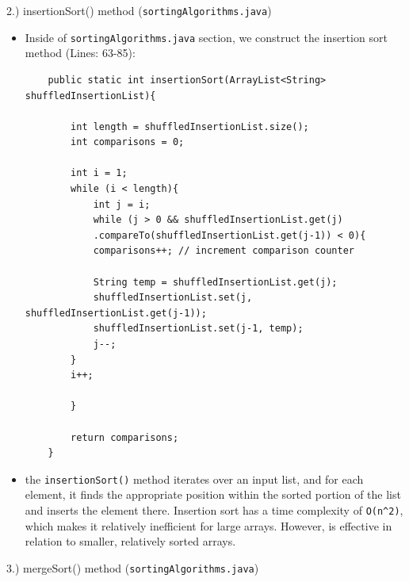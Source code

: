 \documentclass[a4paper,12pt]{article}
\begin{document}
\begin{large}
    2.) insertionSort() method (\verb|sortingAlgorithms.java|)
\end{large}


\begin{itemize}
\item Inside of \verb|sortingAlgorithms.java| section, we construct the insertion sort method (Lines: 63-85):

\begin{verbatim}
    public static int insertionSort(ArrayList<String> shuffledInsertionList){
		
        int length = shuffledInsertionList.size();
        int comparisons = 0; 

        int i = 1;
        while (i < length){
            int j = i;
            while (j > 0 && shuffledInsertionList.get(j)
            .compareTo(shuffledInsertionList.get(j-1)) < 0){ 
            comparisons++; // increment comparison counter

            String temp = shuffledInsertionList.get(j);
            shuffledInsertionList.set(j, shuffledInsertionList.get(j-1)); 
            shuffledInsertionList.set(j-1, temp);
            j--;
        }
        i++;

        }

        return comparisons;
    }
\end{verbatim}
\item the \verb|insertionSort()| method iterates over an input list, and for each element, it finds the appropriate position within the sorted portion of the list and inserts the element there. Insertion sort has a time complexity of \verb|O(n^2)|, which makes it relatively inefficient for large arrays. However, is effective in relation to smaller, relatively sorted arrays.\\

\end{itemize}

\begin{large}
    3.) mergeSort() method (\verb|sortingAlgorithms.java|)
\end{large}
\end{document}
